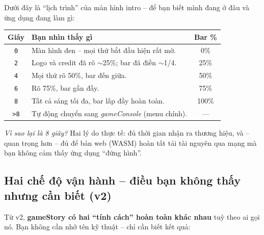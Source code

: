 \documentclass[12pt,a4paper]{article}
\begin{document}
Dưới đây là “lịch trình” của màn hình intro -- để bạn biết mình đang
ở đâu và ứng dụng đang làm gì:

\vspace{4pt}
\begin{tabularx}{\linewidth}{|c|X|c|}
    \hline
    \textbf{Giây} & \textbf{Bạn nhìn thấy gì} & \textbf{Bar \%} \\
    \hline
    \texttt{0}  & Màn hình đen -- mọi thứ bắt đầu hiện rất mờ.            & 0\% \\
    \hline
    \texttt{2}  & Logo và credit đã rõ $\sim$25\%; bar đã điền $\sim$1/4. & 25\% \\
    \hline
    \texttt{4}  & Mọi thứ rõ 50\%, bar đến giữa.                          & 50\% \\
    \hline
    \texttt{6}  & Rõ 75\%, bar gần đầy.                                   & 75\% \\
    \hline
    \texttt{8}  & Tất cả sáng tối đa, bar lấp đầy hoàn toàn.              & 100\% \\
    \hline
    \texttt{>8} & Tự động chuyển sang \textit{gameConsole} (menu chính).   & --- \\
    \hline
\end{tabularx}

\vspace{4pt}
\noindent\textit{Vì sao lại là 8 giây?} Hai lý do thực tế: đủ thời gian
nhận ra thương hiệu, và -- quan trọng hơn -- đủ để bản web (WASM) hoàn
tất tải tài nguyên qua mạng mà bạn không cảm thấy ứng dụng “đứng hình”.

\subsection{Hai chế độ vận hành -- điều bạn không thấy nhưng cần biết (v2)}

Từ v2, \textbf{gameStory có hai “tính cách” hoàn toàn khác nhau} tuỳ
theo ai gọi nó. Bạn không cần nhớ tên kỹ thuật -- chỉ cần biết kết quả:
\end{document}
